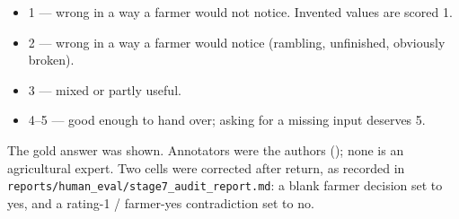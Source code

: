 \begin{itemize}[leftmargin=1.4em]
  \item 1 --- wrong in a way a farmer would not notice. Invented values are scored 1.
  \item 2 --- wrong in a way a farmer would notice (rambling, unfinished, obviously broken).
  \item 3 --- mixed or partly useful.
  \item 4--5 --- good enough to hand over; asking for a missing input deserves 5.
\end{itemize}

The gold answer was shown. Annotators were the authors (); none is an agricultural expert. Two cells were corrected after return, as recorded in \texttt{reports/human\_eval/stage7\_audit\_report.md}: a blank farmer decision set to yes, and a rating-1 / farmer-yes contradiction set to no.
